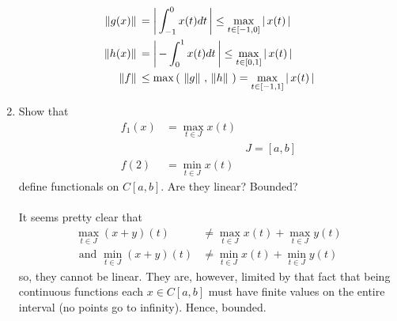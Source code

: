 \documentclass[10pt,a4paper]{report}
\newcommand{\NORM}[1]{\,\left \Vert #1 \right \Vert\,}
\begin{document}
\begin{enumerate}
\begin{align*}
		\NORM{g(x)} &= \BARS{\int_{-1}^0 x(t)dt} \le \max_{t\in [-1,0]} \BARS{x(t)}\\
		\NORM{h(x)} &= \BARS{-\int_0^1 x(t)dt} \le \max_{t\in [0,1]} \BARS{x(t)}\\
		\NORM{f} &\le \max\PAREN{\NORM{g},\NORM{h}} = \max_{t\in [-1,1]} \BARS{x(t)}\\
	\end{align*} 
	\item Show that
	\begin{align*}
		f_1(x) &= \max_{t\in J} x(t) \\
		 & & J=[a,b]\\
		 f(2) &= \min_{t \in J} x(t)
	\end{align*}define functionals on $C[a,b]$.  Are they linear? Bounded?\\
	\\
	It seems pretty clear that 
	\begin{align*}
		\max_{t\in J} (x+y)(t) &\ne \max_{t\in J}x(t) + \max_{t\in J} y(t) \\
		\text{ and } \min_{t\in J} (x+y)(t) &\ne \min_{t\in J}x(t) + \min_{t\in J} y(t) 
	\end{align*}so, they cannot be linear. They are, however, limited by that fact that being continuous functions each $x \in C[a,b]$ must have finite values on the entire interval (no points go to infinity).  Hence, bounded.
\end{enumerate}
\end{document}
